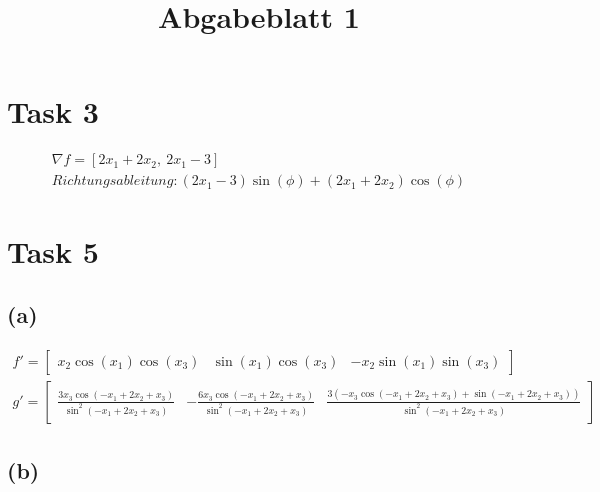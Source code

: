 \documentclass{article}
\title{Abgabeblatt 1}
\author{}
\date{}
\begin{document}
\maketitle

\section*{Task 3}

\begin{align*}
    \nabla f = \left[ 2 x_{1} + 2 x_{2}, \  2 x_{1} - 3\right] \\
    Richtungsableitung: \left(2 x_{1} - 3\right) \sin{\left(\phi \right)} + \left(2 x_{1} + 2 x_{2}\right) \cos{\left(\phi \right)}
\end{align*}

\section*{Task 5}

\subsection*{(a)}

\begin{align*}
    f' = \left[\begin{matrix}x_{2} \cos{\left(x_{1} \right)} \cos{\left(x_{3} \right)} & \sin{\left(x_{1} \right)} \cos{\left(x_{3} \right)} & - x_{2} \sin{\left(x_{1} \right)} \sin{\left(x_{3} \right)}\end{matrix}\right] \\
    g' = \left[\begin{matrix}\frac{3 x_{3} \cos{\left(- x_{1} + 2 x_{2} + x_{3} \right)}}{\sin^{2}{\left(- x_{1} + 2 x_{2} + x_{3} \right)}} & - \frac{6 x_{3} \cos{\left(- x_{1} + 2 x_{2} + x_{3} \right)}}{\sin^{2}{\left(- x_{1} + 2 x_{2} + x_{3} \right)}} & \frac{3 \left(- x_{3} \cos{\left(- x_{1} + 2 x_{2} + x_{3} \right)} + \sin{\left(- x_{1} + 2 x_{2} + x_{3} \right)}\right)}{\sin^{2}{\left(- x_{1} + 2 x_{2} + x_{3} \right)}}\end{matrix}\right]
\end{align*}

\subsection*{(b)}
\end{document}
